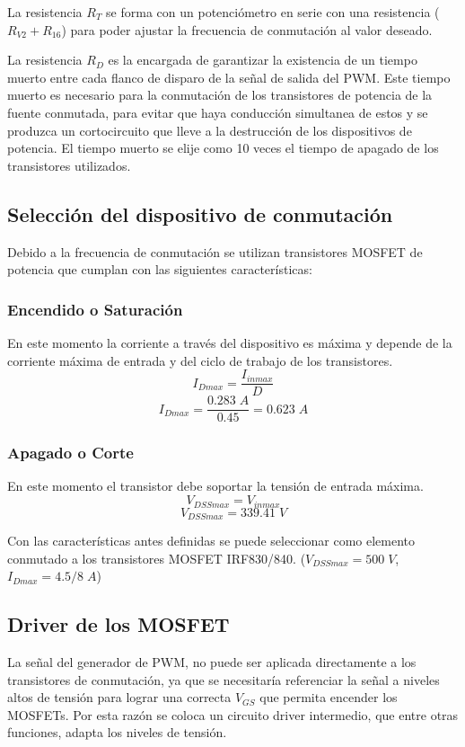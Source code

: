 \documentclass[11pt, a4paper]{article}
\begin{document}
La resistencia $R_T$ se forma con un potenciómetro en serie con una resistencia ($R_{V2} + R_{16}$) para poder ajustar la frecuencia de conmutación al valor deseado.

La resistencia $R_D$ es la encargada de garantizar la existencia de un tiempo muerto entre cada flanco de disparo de la señal de salida del PWM. Este tiempo muerto es necesario para la conmutación de los transistores de potencia de la fuente conmutada, para evitar que haya conducción simultanea de estos y se produzca un cortocircuito que lleve a la destrucción de los dispositivos de potencia. El tiempo muerto se elije como 10 veces el tiempo de apagado de los transistores utilizados.

\subsection{Selección del dispositivo de conmutación}
Debido a la frecuencia de conmutación se utilizan transistores MOSFET de potencia que cumplan con las siguientes características:
\subsubsection{Encendido o Saturación}
En este momento la corriente a través del dispositivo es máxima y depende de la corriente máxima de entrada y del ciclo de trabajo de los transistores.
\begin{equation}
I_{Dmax} = \frac{I_{inmax}}{D}
\label{IDmax}
\end{equation}
\[ I_{Dmax} = \frac{0.283 \; A}{0.45} = 0.623 \; A \]

\subsubsection{Apagado o Corte}
En este momento el transistor debe soportar la tensión de entrada máxima.
\begin{equation}
V_{DSSmax} = V_{inmax}
\label{VDmax}
\end{equation}
\[ V_{DSSmax} = 339.41 \; V \]

Con las características antes definidas se puede seleccionar como elemento conmutado a los transistores MOSFET IRF830/840. ($V_{DSSmax} = 500 \; V$, $I_{Dmax} = 4.5/8 \; A$)

\subsection{Driver de los MOSFET}
La señal del generador de PWM, no puede ser aplicada directamente a los transistores de conmutación, ya que se necesitaría referenciar la señal a niveles altos de tensión para lograr una correcta $V_{GS}$ que permita
encender los MOSFETs. Por esta razón se coloca un circuito driver intermedio, que entre otras funciones, adapta los niveles de tensión.
\end{document}
